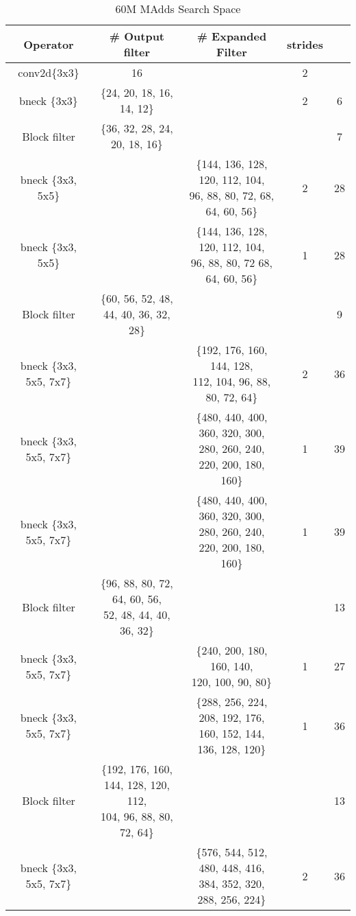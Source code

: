 \begin{table}
\caption{60M MAdds Search Space} 
\begin{center}

\begin{tabular}[hp]{c|c|c|c|c}
\hline
\hline
 Operator  &\# Output filter &\# Expanded Filter &strides & \\ 
\hline
  conv2d\{3x3\} &16 & &2 \\
\hline
  bneck \{3x3\} & \{24, 20, 18, 16, 14, 12\} & &2 &6\\
\hline
  Block filter &\{36, 32, 28, 24, 20, 18, 16\} & & &7 \\
  bneck \{3x3, 5x5\} & &\shortstack{\{144, 136, 128, 120, 112, 104, \\ 96, 88, 80, 72, 68, 64, 60, 56\}} &2 &28\\
  bneck \{3x3, 5x5\} & &\shortstack{\{144, 136, 128, 120, 112, 104, \\ 96, 88, 80, 72 68, 64, 60, 56\}} &1 &28\\
\hline
Block filter &\{60, 56, 52, 48, 44, 40, 36, 32, 28\} & & &9 \\
  bneck \{3x3, 5x5, 7x7\} & &\shortstack{\{192, 176, 160, 144, 128,\\ 112, 104, 96, 88, 80, 72, 64\}} &2 &36 \\
  bneck \{3x3, 5x5, 7x7\} & &\shortstack{\{480, 440, 400, 360, 320, 300, \\ 280, 260, 240, 220, 200, 180, 160\}} &1 &39\\
  bneck \{3x3, 5x5, 7x7\} & &\shortstack{\{480, 440, 400, 360, 320, 300, \\ 280, 260, 240, 220, 200, 180, 160\}} &1 & 39\\
\hline
Block filter &\shortstack{\{96, 88, 80, 72, 64, 60, 56, \\ 52, 48, 44, 40, 36, 32\}} & & &13 \\
  bneck \{3x3, 5x5, 7x7\} & &\shortstack{\{240, 200, 180, 160, 140,\\ 120, 100, 90, 80\}} &1 &27 \\
  bneck \{3x3, 5x5, 7x7\} & &\shortstack{\{288, 256, 224, 208, 192, 176,\\ 160, 152, 144, 136, 128, 120\}} &1 &36 \\
\hline
Block filter &\shortstack{\{192, 176, 160, 144, 128, 120, 112, \\ 104, 96, 88, 80, 72, 64\}} & & &13 \\
  bneck \{3x3, 5x5, 7x7\} & &\shortstack{\{576, 544, 512, 480, 448, 416, \\ 384, 352, 320, 288, 256, 224\}} &2 &36 \\

\end{tabular}
\end{center}
\end{table}
